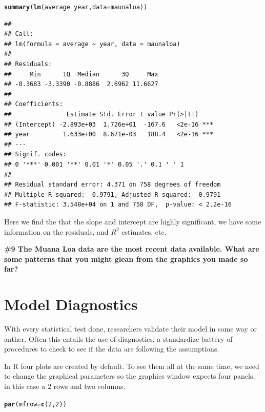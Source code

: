\documentclass{tufte-handout}\usepackage[]{graphicx}\usepackage[]{xcolor}
\makeatletter
\newcommand{\hlnum}[1]{\textcolor[rgb]{0.686,0.059,0.569}{#1}}%
\newcommand{\hlopt}[1]{\textcolor[rgb]{0,0,0}{#1}}%
\newcommand{\hlstd}[1]{\textcolor[rgb]{0.345,0.345,0.345}{#1}}%
\newcommand{\hlkwc}[1]{\textcolor[rgb]{0.333,0.667,0.333}{#1}}%
\newcommand{\hlkwd}[1]{\textcolor[rgb]{0.737,0.353,0.396}{\textbf{#1}}}%
\newenvironment{kframe}{%
 \def\at@end@of@kframe{}%
 \ifinner\ifhmode%
  \def\at@end@of@kframe{\end{minipage}}%
  \begin{minipage}{\columnwidth}%
 \fi\fi%
 \def\FrameCommand##1{\hskip\@totalleftmargin \hskip-\fboxsep
 \colorbox{shadecolor}{##1}\hskip-\fboxsep
     \hskip-\linewidth \hskip-\@totalleftmargin \hskip\columnwidth}%
 \MakeFramed {\advance\hsize-\width
   \@totalleftmargin\z@ \linewidth\hsize
   \@setminipage}}%
 {\par\unskip\endMakeFramed%
 \at@end@of@kframe}
\newenvironment{knitrout}{}{} %
\makeatother
\begin{document}
\begin{knitrout}
\color{fgcolor}\begin{kframe}
\begin{alltt}
\hlkwd{summary}\hlstd{(}\hlkwd{lm}\hlstd{(average} \hlopt{~} \hlstd{year,} \hlkwc{data}\hlstd{=maunaloa))}
\end{alltt}
\begin{verbatim}
## 
## Call:
## lm(formula = average ~ year, data = maunaloa)
## 
## Residuals:
##     Min      1Q  Median      3Q     Max 
## -8.3683 -3.3390 -0.8886  2.6962 11.6627 
## 
## Coefficients:
##               Estimate Std. Error t value Pr(>|t|)    
## (Intercept) -2.893e+03  1.726e+01  -167.6   <2e-16 ***
## year         1.633e+00  8.671e-03   188.4   <2e-16 ***
## ---
## Signif. codes:  
## 0 '***' 0.001 '**' 0.01 '*' 0.05 '.' 0.1 ' ' 1
## 
## Residual standard error: 4.371 on 758 degrees of freedom
## Multiple R-squared:  0.9791,	Adjusted R-squared:  0.9791 
## F-statistic: 3.548e+04 on 1 and 758 DF,  p-value: < 2.2e-16
\end{verbatim}
\end{kframe}
\end{knitrout}

Here we find the that the slope and intercept are highly significant, we have some information on the residuals, and $R^2$ estimates, etc.

\bigskip
\noindent  \textbf{\#9 The Muana Loa data are the most recent data available. What are some patterns that you might glean from the graphics you made so far? }

\section{Model Diagnostics}

With every statistical test done, researchers validate their model in some way or anther. Often this entails the use of diagnostics, a standardize battery of procedures to check to see if the data are following the assumptions. 

In R four plots are created by default.  To see them all at the same time, we need to change the graphical parameters so the graphics window expects four panels, in this case a 2 rows and two columns. 

\begin{knitrout}
\color{fgcolor}\begin{kframe}
\begin{alltt}
\hlkwd{par}\hlstd{(}\hlkwc{mfrow}\hlstd{=}\hlkwd{c}\hlstd{(}\hlnum{2}\hlstd{,}\hlnum{2}\hlstd{))}
\end{alltt}
\end{kframe}
\end{knitrout}
\end{document}
